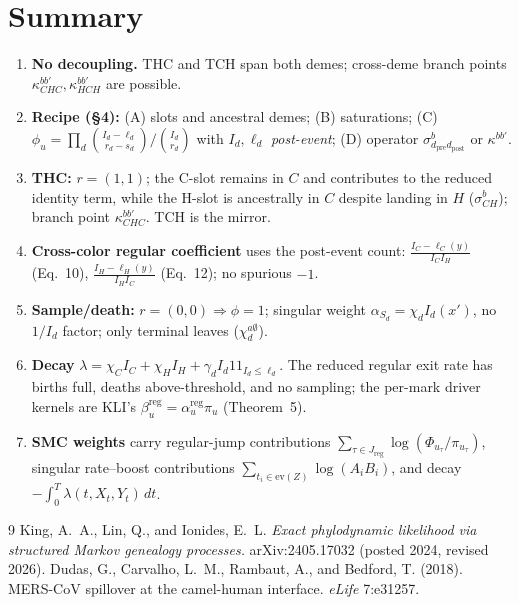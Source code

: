 \documentclass[11pt]{article}
\newcommand{\evZ}{\mathrm{ev}(Z)}
\newcommand{\ind}{1\!\!1}
\theoremstyle{plain}
\begin{document}
\section{Summary}
\begin{enumerate}[leftmargin=1.6em,nosep]
\item \textbf{No decoupling.} THC and TCH span both demes; cross-deme branch points
$\kappa^{bb'}_{CHC},\kappa^{bb'}_{HCH}$ are possible.
\item \textbf{Recipe (\S4):} (A) slots and ancestral demes; (B) saturations; (C)
$\phi_u=\prod_d\binom{I_d-\ell_d}{r_d-s_d}/\binom{I_d}{r_d}$ with $I_d,\ell_d$ \emph{post-event};
(D) operator $\sigma^b_{d_{\mathrm{pre}}d_{\mathrm{post}}}$ or $\kappa^{bb'}$.
\item \textbf{THC:} $r=(1,1)$; the C-slot remains in $C$ and contributes to the reduced identity term, while the H-slot is ancestrally in $C$ despite landing in $H$ ($\sigma^b_{CH}$); branch point $\kappa^{bb'}_{CHC}$. TCH is the mirror.
\item \textbf{Cross-color regular coefficient} uses the post-event count: $\frac{I_C-\ell_C(y)}{I_CI_H}$
(Eq.~10), $\frac{I_H-\ell_H(y)}{I_HI_C}$ (Eq.~12); no spurious $-1$.
\item \textbf{Sample/death:} $r=(0,0)\Rightarrow\phi=1$; singular weight $\alpha_{S_d}=\chi_d I_d(x')$,
no $1/I_d$ factor; only terminal leaves ($\chi^{a\emptyset}_d$).
\item \textbf{Decay} $\lambda=\chi_C I_C+\chi_H I_H+\gamma_d I_d\ind_{I_d\le\ell_d}$. The reduced
regular exit rate has births full, deaths above-threshold, and no sampling; the per-mark driver
kernels are KLI's $\beta^{\mathrm{reg}}_u=\alpha^{\mathrm{reg}}_u\pi_u$ (Theorem~5).
\item \textbf{SMC weights} carry regular-jump contributions
$\sum_{\tau\in J_{\mathrm{reg}}}\log(\Phi_{u_\tau}/\pi_{u_\tau})$,
singular rate--boost contributions $\sum_{t_i\in\evZ}\log(A_iB_i)$,
and decay $-\int_0^T\lambda(t,X_t,Y_t)\,dt$.
\end{enumerate}

\begin{thebibliography}{9}
 King, A.~A., Lin, Q., and Ionides, E.~L. \emph{Exact phylodynamic likelihood
via structured Markov genealogy processes.} arXiv:2405.17032 (posted 2024, revised 2026).
 Dudas, G., Carvalho, L.~M., Rambaut, A., and Bedford, T. (2018). MERS-CoV spillover
at the camel-human interface. \emph{eLife} 7:e31257.
\end{thebibliography}
\end{document}
